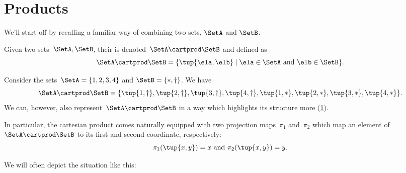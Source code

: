 

\section{Products}
\label{sec:combination-products}

We'll start off by recalling a familiar way of combining two sets, $\SetA$ and $\SetB$.


\begin{definition}
  \label{def:cartesian-product}
  Given two sets~$\SetA,\SetB$, their \emph{} is denoted~$\SetA \cartprod  \SetB$ and defined as
  \begin{equation*}
    \SetA \cartprod \SetB =\{ \tup{\ela,\elb}\mid \ela \in \SetA \text{ and } \elb \in \SetB \}.
  \end{equation*}
\end{definition}

\begin{example}
  Consider the sets~$\SetA = \{1, 2, 3, 4\}$ and $\SetB = \{ \ast, \dagger \}$.
  We have
  \begin{equation*}
    \SetA \cartprod \SetB = \{ \tup{1, \dagger}, \tup{2, \dagger}, \tup{3, \dagger}, \tup{4, \dagger}, \tup{1, *}, \tup{2, *}, \tup{3, *}, \tup{4, *} \}.
  \end{equation*}
  We can, however, also represent~$\SetA \cartprod \SetB$ in a way which highlights its structure more (\cref{fig:example_cartesian}).

  \begin{figure}[h!]
    \begin{center}
    \end{center}
    \caption{\label{fig:example_cartesian}}
  \end{figure}
  In particular, the cartesian product comes naturally equipped with two projection maps~$\pi_1$ and~$\pi_2$ which map an element of~$\SetA \cartprod \SetB$ to its first and second coordinate, respectively:
  \begin{equation*}
    \pi_1(\tup{x,y}) =  x \text{ and } \pi_2(\tup{x,y}) = y.
  \end{equation*}

  We will often depict the situation like this:
  \begin{center}
  \end{center}
\end{example}

